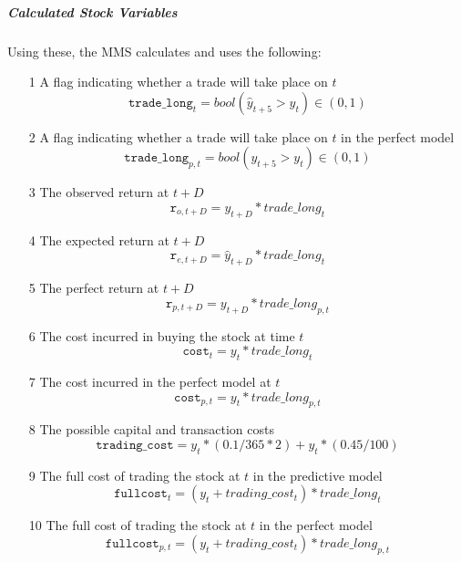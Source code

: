 \documentclass[a4paper,11pt,oneside]{article}
\theoremstyle{plain}
\theoremstyle{definition}
\begin{document}
\subparagraph{Calculated Stock Variables}

Using these, the MMS calculates and uses the following:

\begin{itemize}
	\item [1] A flag indicating whether a trade will take place on $t$
				\begin{equation}
				\texttt{trade\_long}_t = bool(\hat{y}_{t+5} > y_t) \in (0, 1)
				\end{equation}
	\item [2] A flag indicating whether a trade will take place on $t$ in the perfect model
				\begin{equation}
				\texttt{trade\_long}_{p,t} = bool({y}_{t+5} > y_t) \in (0, 1)
				\end{equation}
	\item [3] The observed return at $t+D$
				\begin{equation}
				\texttt{r}_{o, t + D} = y_{t+D} * trade\_long_t
				\end{equation}	
	\item [4] The expected return at $t+D$
				\begin{equation}
				\texttt{r}_{e, t + D} = \hat{y}_{t+D} * trade\_long_t 
				\end{equation}
	\item [5] The perfect return at $t+D$
				\begin{equation}
				\texttt{r}_{p, t + D} = y_{t+D} * trade\_long_{p,t}
				\end{equation}
	\item [6] The cost incurred in buying the stock at time $t$
				\begin{equation}
				\texttt{cost}_t = y_t * trade\_long_t
				\end{equation}
	\item [7] The cost incurred in the perfect model at $t$
				\begin{equation}
				\texttt{cost}_{p,t} = y_t * trade\_long_{p,t}
				\end{equation}
	\item [8] The possible capital and transaction costs
				\begin{equation}
				\texttt{trading\_cost}= y_t * (0.1 / 365 * 2) + y_t * (0.45 / 100)
				\end{equation}
	\item [9] The full cost of trading the stock at $t$ in the predictive model
				\begin{equation}
				\texttt{fullcost}_t = (y_t + trading\_cost_t) * trade\_long_t
				\end{equation}	
	\item [10] The full cost of trading the stock at $t$ in the perfect model
				\begin{equation}
				\texttt{fullcost}_{p,t} = (y_t + trading\_cost_t) * trade\_long_{p, t}
				\end{equation}
\end{itemize}
\end{document}
